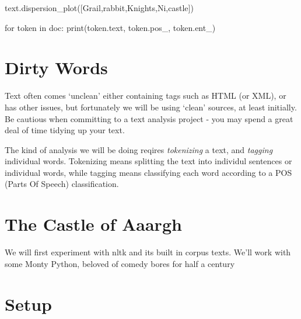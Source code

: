\documentclass[
  letterpaper,
  DIV=11,
  numbers=noendperiod]{scrreprt}
\newenvironment{Shaded}{\begin{snugshade}}{\end{snugshade}}
\newcommand{\BuiltInTok}[1]{\textcolor[rgb]{0.00,0.23,0.31}{#1}}
\newcommand{\ControlFlowTok}[1]{\textcolor[rgb]{0.00,0.23,0.31}{#1}}
\newcommand{\KeywordTok}[1]{\textcolor[rgb]{0.00,0.23,0.31}{#1}}
\newcommand{\NormalTok}[1]{\textcolor[rgb]{0.00,0.23,0.31}{#1}}
\newcommand{\StringTok}[1]{\textcolor[rgb]{0.13,0.47,0.30}{#1}}
\begin{document}
\begin{Shaded}
\begin{Highlighting}[]
\NormalTok{text.dispersion\_plot([}\StringTok{\textquotesingle{}Grail\textquotesingle{}}\NormalTok{,}\StringTok{\textquotesingle{}rabbit\textquotesingle{}}\NormalTok{,}\StringTok{\textquotesingle{}Knights\textquotesingle{}}\NormalTok{,}\StringTok{\textquotesingle{}Ni\textquotesingle{}}\NormalTok{,}\StringTok{\textquotesingle{}castle\textquotesingle{}}\NormalTok{])}
\end{Highlighting}
\end{Shaded}

\begin{Shaded}
\begin{Highlighting}[]
\ControlFlowTok{for}\NormalTok{ token }\KeywordTok{in}\NormalTok{ doc:}
    \BuiltInTok{print}\NormalTok{(token.text, token.pos\_, token.ent\_)}
\end{Highlighting}
\end{Shaded}

\hypertarget{dirty-words-1}{%
\section{Dirty Words}\label{dirty-words-1}}

Text often comes `unclean' either containing tags such as HTML (or XML),
or has other issues, but fortunately we will be using `clean' sources,
at least initially. Be cautious when committing to a text analysis
project - you may spend a great deal of time tidying up your text.

The kind of analysis we will be doing reqires \emph{tokenizing} a text,
and \emph{tagging} individual words. Tokenizing means splitting the text
into individul sentences or individual words, while tagging means
classifying each word according to a POS (Parts Of Speech)
classification.

\hypertarget{the-castle-of-aaargh}{%
\section{The Castle of Aaargh}\label{the-castle-of-aaargh}}

We will first experiment with nltk and its built in corpus texts. We'll
work with some Monty Python, beloved of comedy bores for half a century

\hypertarget{setup}{%
\section{Setup}\label{setup}}
\end{document}
